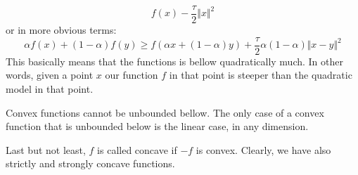 \begin{equation}
    f(x)-\frac{\tau}{2}\Vert x \Vert^2
\end{equation}
or in more obvious terms:
\begin{equation}
    \alpha f(x) + (1-\alpha) f(y) \geq f(\alpha x + (1-\alpha) y) + \frac{\tau}{2} \alpha(1-\alpha) \Vert x-y \Vert^2
\end{equation}
This basically means that the functions is bellow quadratically much. In other words, given a point $x$ our function $f$ in that point is steeper than the quadratic model in that point.
\par Convex functions cannot be unbounded bellow. The only case of a convex function that is unbounded below is the linear case, in any dimension.
\par Last but not least, $f$ is called concave if $-f$ is convex. Clearly, we have also strictly and strongly concave functions.
%
